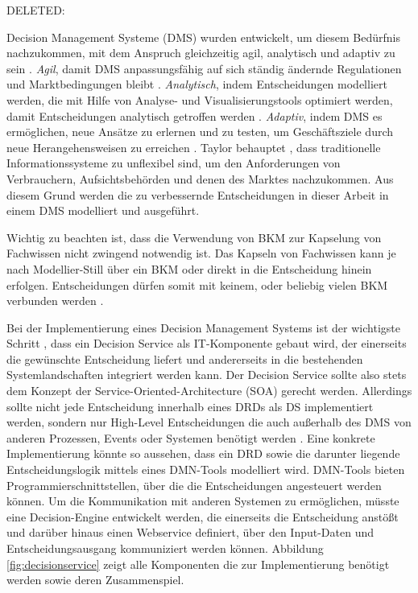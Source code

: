 DELETED:

Decision Management Systeme (DMS) wurden entwickelt, um diesem Bedürfnis nachzukommen, mit dem Anspruch gleichzeitig agil, analytisch und adaptiv zu sein \cite[vgl. S. 1]{JT12}. \textit{Agil}, damit DMS anpassungsfähig auf sich ständig ändernde Regulationen und Marktbedingungen bleibt \cite[vgl. S. 4]{JT11}. \textit{Analytisch}, indem Entscheidungen modelliert werden, die mit Hilfe von Analyse- und Visualisierungstools optimiert werden, damit Entscheidungen analytisch getroffen werden \cite[vgl. S. 8]{JT11}. \textit{Adaptiv}, indem DMS es ermöglichen, neue Ansätze zu erlernen und zu testen, um Geschäftsziele durch neue Herangehensweisen zu erreichen \cite[vgl. S. 15]{JT11}. Taylor behauptet \cite[vgl. S. 1]{JT12}, dass traditionelle Informationssysteme zu unflexibel sind, um den Anforderungen von Verbrauchern, Aufsichtsbehörden und denen des Marktes nachzukommen. Aus diesem Grund werden die zu verbessernde Entscheidungen in dieser Arbeit in einem DMS modelliert und ausgeführt. 

Wichtig zu beachten ist, dass die Verwendung von BKM zur Kapselung von Fachwissen nicht zwingend notwendig ist. Das Kapseln von Fachwissen kann je nach Modellier-Still über ein BKM oder direkt in die Entscheidung hinein erfolgen. Entscheidungen dürfen somit mit keinem, oder beliebig vielen BKM verbunden werden \cite[vgl. S. 60]{OM16}.

Bei der Implementierung eines Decision Management Systems ist der wichtigste Schritt \cite[vgl. S. 115]{JT11}, dass ein Decision Service als IT-Komponente gebaut wird, der einerseits die gewünschte Entscheidung liefert und andererseits in die bestehenden Systemlandschaften integriert werden kann. Der Decision Service sollte also stets dem Konzept der Service-Oriented-Architecture (SOA) gerecht werden. Allerdings sollte nicht jede Entscheidung innerhalb eines DRDs als DS implementiert werden, sondern nur High-Level Entscheidungen die auch außerhalb des DMS von anderen Prozessen, Events oder Systemen benötigt werden \cite[vgl. S. 116]{JT11}. Eine konkrete Implementierung könnte so aussehen, dass ein DRD sowie die darunter liegende Entscheidungslogik mittels eines DMN-Tools modelliert wird. DMN-Tools bieten Programmierschnittstellen, über die die Entscheidungen angesteuert werden können. Um die Kommunikation mit anderen Systemen zu ermöglichen, müsste eine Decision-Engine \cite[vgl. S. 41]{BR16} entwickelt werden, die einerseits die Entscheidung anstößt und darüber hinaus einen Webservice definiert, über den Input-Daten und Entscheidungsausgang kommuniziert werden können. Abbildung \ref{fig:decisionservice} zeigt alle Komponenten die zur Implementierung benötigt werden sowie deren Zusammenspiel.


